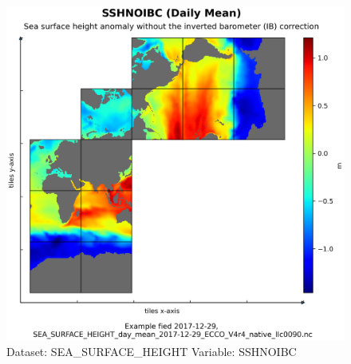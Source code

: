 \begin{figure}[H]
\centering
\includegraphics[scale=0.55]{../images/plots/native_plots/Sea_Surface_Height/SSHNOIBC.png}
\caption{Dataset: SEA\_SURFACE\_HEIGHT Variable: SSHNOIBC}
\label{tab:table-SEA_SURFACE_HEIGHT_SSHNOIBC-Plot}
\end{figure}